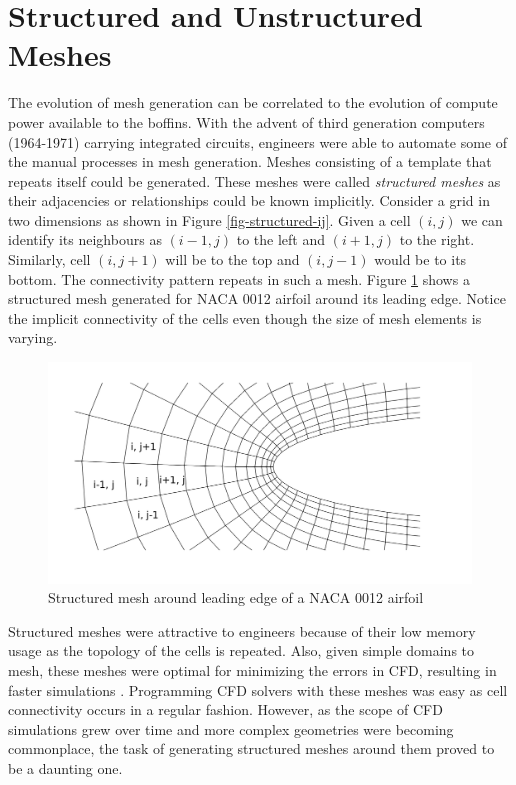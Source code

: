 \section{Structured and Unstructured Meshes}

The evolution of mesh generation can be correlated to the evolution of compute power available to the boffins. With the advent of third generation computers (1964-1971) carrying integrated circuits, engineers were able to automate some of the manual processes in mesh generation. Meshes consisting of a template that repeats itself could be generated. These meshes were called \textit{structured meshes} as their adjacencies or relationships could be known implicitly. Consider a grid in two dimensions as shown in Figure \ref{fig-structured-ij}. Given a cell $(i,j)$ we can identify its neighbours as $(i-1, j)$ to the left and $(i+1, j)$ to the right. Similarly, cell $(i, j+1)$ will be to the top and $(i, j-1)$ would be to its bottom. The connectivity pattern repeats in such a mesh. Figure \ref{fig-structuredNaca0012} shows a structured mesh generated for NACA 0012 airfoil around its leading edge. Notice the implicit connectivity of the cells even though the size of mesh elements is varying.

\begin{figure}
  \centering
  \includegraphics[width=0.8\linewidth]{img/intro/stucturedNaca0012.png}
  \caption{Structured mesh around leading edge of a NACA 0012 airfoil}
  \label{fig-structuredNaca0012}
\end{figure}


Structured meshes were attractive to engineers because of their low memory usage as the topology of the cells is repeated. Also, given simple domains to mesh, these meshes were optimal for minimizing the errors in CFD, resulting in faster simulations \cite{d1991optimal}. Programming CFD solvers with these meshes was easy as cell connectivity occurs in a regular fashion. However, as the scope of CFD simulations grew over time and more complex geometries were becoming commonplace, the task of generating structured meshes around them proved to be a daunting one. 

